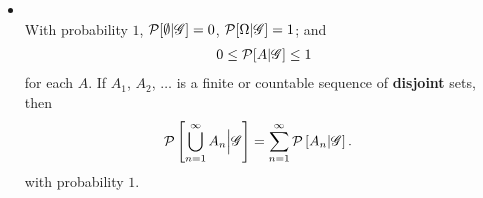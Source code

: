 \documentclass[11pt]{article}
\begin{document}
\begin{itemize}
\item \begin{proposition} \citep{billingsley2008probability}\\
With probability $1$, ${\mathcal P}[\emptyset | {\mathscr G}] = 0$, ${\mathcal P}[\Omega | {\mathscr G}] = 1$; and
\begin{align*}
0 \le {\mathcal P}[A | {\mathscr G}] \le 1
\end{align*}
for each $A$. If $A_1$, $A_2$, $\ldots$ is a finite or countable sequence of \textbf{disjoint} sets, then
\begin{align*}
{\mathcal P}\left[\bigcup_{n=1}^{\infty}A_n \Bigr| {\mathscr G}\right] &= \sum_{n=1}^{\infty}{\mathcal P}\left[A_n | {\mathscr G}\right].
\end{align*}
with probability $1$.
\end{proposition}
\end{itemize}
\end{document}

